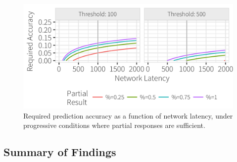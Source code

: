 \begin{figure}
	\centering
	\includegraphics[width=1\columnwidth]{figures/model_partial}
 	\caption{Required prediction accuracy as a function of network latency, under progressive conditions where partial responses are sufficient.}
    \label{fig:model_partial}
\end{figure}




\subsection{Summary of Findings}

